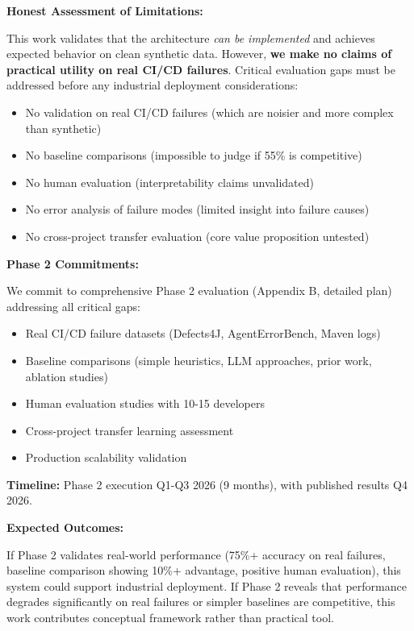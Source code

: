 \documentclass[11pt]{article}
\begin{document}
\textbf{Honest Assessment of Limitations:}

This work validates that the architecture \textit{can be implemented} and achieves expected behavior on clean synthetic data. However, \textbf{we make no claims of practical utility on real CI/CD failures}. Critical evaluation gaps must be addressed before any industrial deployment considerations:

\begin{itemize}
    \item No validation on real CI/CD failures (which are noisier and more complex than synthetic)
    \item No baseline comparisons (impossible to judge if 55\% is competitive)
    \item No human evaluation (interpretability claims unvalidated)
    \item No error analysis of failure modes (limited insight into failure causes)
    \item No cross-project transfer evaluation (core value proposition untested)
\end{itemize}

\textbf{Phase 2 Commitments:}

We commit to comprehensive Phase 2 evaluation (Appendix B, detailed plan) addressing all critical gaps:

\begin{itemize}
    \item Real CI/CD failure datasets (Defects4J, AgentErrorBench, Maven logs)
    \item Baseline comparisons (simple heuristics, LLM approaches, prior work, ablation studies)
    \item Human evaluation studies with 10-15 developers
    \item Cross-project transfer learning assessment
    \item Production scalability validation
\end{itemize}

\textbf{Timeline:} Phase 2 execution Q1-Q3 2026 (9 months), with published results Q4 2026.

\textbf{Expected Outcomes:}

If Phase 2 validates real-world performance (75\%+ accuracy on real failures, baseline comparison showing 10\%+ advantage, positive human evaluation), this system could support industrial deployment. If Phase 2 reveals that performance degrades significantly on real failures or simpler baselines are competitive, this work contributes conceptual framework rather than practical tool.
\end{document}
